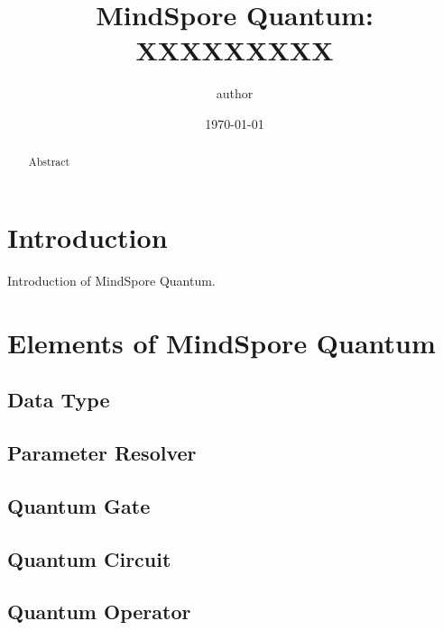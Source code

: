 \documentclass[pra,twocolumn,superscriptaddress,floatfix,nofootinbib,amsmath,amssymb]{revtex4-1}
\begin{document}
\title{MindSpore Quantum: XXXXXXXXX
}



\author{author}


\date{\today}



\begin{abstract}
    Abstract
\end{abstract}
\maketitle
\tableofcontents

\section{Introduction}
Introduction of MindSpore Quantum.


\section{Elements of MindSpore Quantum}

\subsection{Data Type}


\subsection{Parameter Resolver}


\subsection{Quantum Gate}


\subsection{Quantum Circuit}


\subsection{Quantum Operator}

\end{document}
